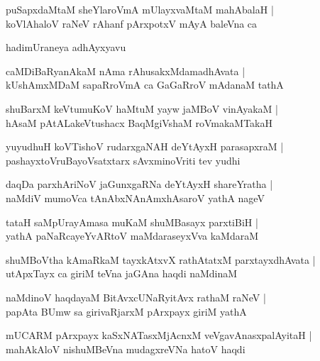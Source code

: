\documentclass[twoside,12pt,openright]{book}
\newcounter{shloka}[chapter]
\begin{document}
\begin{shloka}%
puSapxdaMtaM sheYlaroVmA mUlayxvaMtaM mahAbalaH |\\
koVlAhaloV raNeV rAhanf pArxpotxV mAyA baleVna ca 
\end{shloka}

\begin{center}
hadimUraneya adhAyxyavu
\end{center}

\begin{shloka}%
caMDiBaRyanAkaM nAma rAhusakxMdamadhAvata |\\
kUshAmxMDaM sapaRroVmA ca GaGaRroV mAdanaM tathA 
\end{shloka}

\begin{shloka}%
shuBarxM keVtumuKoV haMtuM yayw jaMBoV vinAyakaM |\\
hAsaM pAtALakeVtushacx BaqMgiVshaM roVmakaMTakaH 
\end{shloka}

\begin{shloka}%
yuyudhuH koVTishoV rudarxgaNAH deYtAyxH parasapxraM |\\
pashayxtoVruBayoVsatxtarx sAvxminoVriti tev yudhi 
\end{shloka}

\begin{shloka}%
daqDa parxhAriNoV jaGunxgaRNa deYtAyxH shareYratha |\\
naMdiV mumoVca tAnAbxNAnAmxhAsaroV yathA nageV
\end{shloka}

\begin{shloka}%
tataH saMpUrayAmasa muKaM shuMBasayx parxtiBiH |\\
yathA paNaRcayeYvARtoV maMdaraseyxVva kaMdaraM 
\end{shloka}

\begin{shloka}%
shuMBoVtha kAmaRkaM tayxkAtxvX rathAtatxM parxtayxdhAvata |\\
utApxTayx ca giriM teVna jaGAna haqdi naMdinaM 
\end{shloka}

\begin{shloka}%
naMdinoV haqdayaM BitAvxcUNaRyitAvx rathaM raNeV |\\
papAta BUmw sa girivaRjarxM pArxpayx giriM yathA 
\end{shloka}

\begin{shloka}%
mUCARM pArxpayx kaSxNATasxMjAcnxM veVgavAnasxpalAyitaH |\\
mahAkAloV nishuMBeVna mudagxreVNa hatoV haqdi 
\end{shloka}
\end{document}
